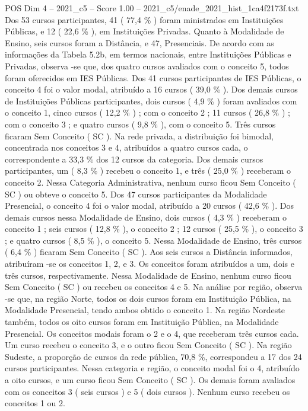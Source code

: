 \begin{textsample}{POS Dim 4 – 2021\_c5 – Score 1.00 – 2021\_c5/enade\_2021\_hist\_1ca4f2173f.txt}
Dos 53 cursos participantes, 41 ( 77,4 \% ) foram ministrados em Instituições Públicas, e 12 ( 22,6 \% ), em Instituições Privadas.
Quanto à Modalidade de Ensino, seis cursos foram a Distância, e 47, Presenciais.
De acordo com as informações da Tabela 5.2b, em termos nacionais, entre Instituições Públicas e Privadas, observa -se que, dos quatro cursos avaliados com o conceito 5, todos foram oferecidos em IES Públicas.
Dos 41 cursos participantes de IES Públicas, o conceito 4 foi o valor modal, atribuído a 16 cursos ( 39,0 \% ).
Dos demais cursos de Instituições Públicas participantes, dois cursos ( 4,9 \% ) foram avaliados com o conceito 1, cinco cursos ( 12,2 \% ) ; com o conceito 2 ; 11 cursos ( 26,8 \% ) ; com o conceito 3 ; e quatro cursos ( 9,8 \% ), com o conceito 5.
Três cursos ficaram Sem Conceito ( SC ).
Na rede privada, a distribuição foi bimodal, concentrada nos conceitos 3 e 4, atribuídos a quatro cursos cada, o correspondente a 33,3 \% dos 12 cursos da categoria.
Dos demais cursos participantes, um ( 8,3 \% ) recebeu o conceito 1, e três ( 25,0 \% ) receberam o conceito 2.
Nessa Categoria Administrativa, nenhum curso ficou Sem Conceito ( SC ) ou obteve o conceito 5.
Dos 47 cursos participantes da Modalidade Presencial, o conceito 4 foi o valor modal, atribuído a 20 cursos ( 42,6 \% ).
Dos demais cursos nessa Modalidade de Ensino, dois cursos ( 4,3 \% ) receberam o conceito 1 ; seis cursos ( 12,8 \% ), o conceito 2 ; 12 cursos ( 25,5 \% ), o conceito 3 ; e quatro cursos ( 8,5 \% ), o conceito 5.
Nessa Modalidade de Ensino, três cursos ( 6,4 \% ) ficaram Sem Conceito ( SC ).
Aos seis cursos a Distância informados, atribuíram -se os conceitos 1, 2, e 3.
Os conceitos foram atribuídos a um, dois e três cursos, respectivamente.
Nessa Modalidade de Ensino, nenhum curso ficou Sem Conceito ( SC ) ou recebeu os conceitos 4 e 5.
Na análise por região, observa -se que, na região Norte, todos os dois cursos foram em Instituição Pública, na Modalidade Presencial, tendo ambos obtido o conceito 1.
Na região Nordeste também, todos os oito cursos foram em Instituição Pública, na Modalidade Presencial.
Os conceitos modais foram o 2 e o 4, que receberam três cursos cada.
Um curso recebeu o conceito 3, e o outro ficou Sem Conceito ( SC ).
Na região Sudeste, a proporção de cursos da rede pública, 70,8 \%, correspondeu a 17 dos 24 cursos participantes.
Nessa categoria e região, o conceito modal foi o 4, atribuído a oito cursos, e um curso ficou Sem Conceito ( SC ).
Os demais foram avaliados com os conceitos 3 ( seis cursos ) e 5 ( dois cursos ).
Nenhum curso recebeu os conceitos 1 ou 2.

\end{textsample}
